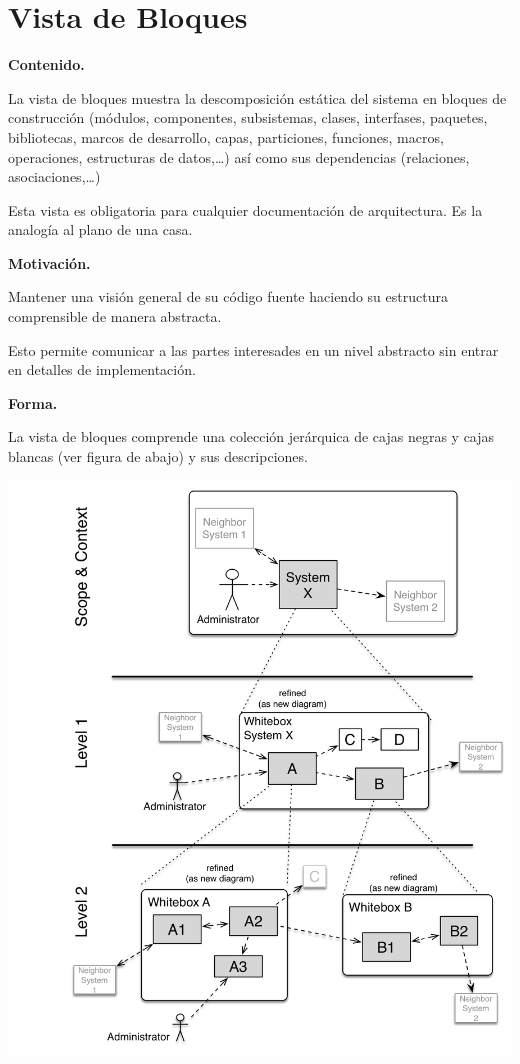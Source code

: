 \documentclass[]{article}
\begin{document}
\hypertarget{section-building-block-view}{%
\section{Vista de Bloques}\label{section-building-block-view}}

\textbf{Contenido.}

La vista de bloques muestra la descomposición estática del sistema en
bloques de construcción (módulos, componentes, subsistemas, clases,
interfases, paquetes, bibliotecas, marcos de desarrollo, capas,
particiones, funciones, macros, operaciones, estructuras de
datos,\ldots{}) así como sus dependencias (relaciones,
asociaciones,\ldots{})

Esta vista es obligatoria para cualquier documentación de arquitectura.
Es la analogía al plano de una casa.

\textbf{Motivación.}

Mantener una visión general de su código fuente haciendo su estructura
comprensible de manera abstracta.

Esto permite comunicar a las partes interesades en un nivel abstracto
sin entrar en detalles de implementación.

\textbf{Forma.}

La vista de bloques comprende una colección jerárquica de cajas negras y
cajas blancas (ver figura de abajo) y sus descripciones.

\includegraphics{images/05_building_blocks-ES.png}
\end{document}
